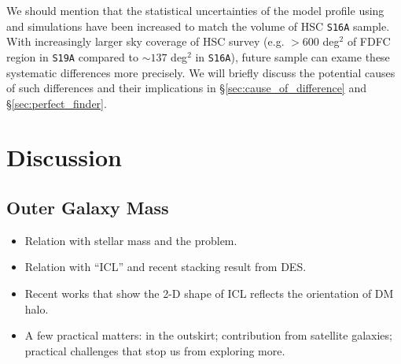 \documentclass[fleqn,usenatbib,useAMS,english]{mnras}
\begin{document}
    We should mention that the statistical uncertainties of the model \dsigma{} profile
    using  and \smdpl{} simulations have been increased to match the volume of
    HSC \texttt{S16A} sample.
    With increasingly larger sky coverage of HSC survey (e.g. $>600$ deg$^2$ of FDFC region
    in \texttt{S19A} compared to $\sim 137$ deg$^2$ in \texttt{S16A}), future sample can
    exame these systematic differences more precisely.
    We will briefly discuss the potential causes of such differences and their implications
    in \S \ref{sec:cause_of_difference} and \S \ref{sec:perfect_finder}.

\section{Discussion}
    \label{sec:discussion}

\subsection{Outer Galaxy Mass}
    \label{sec:outer_mstar}




    \begin{itemize}

        \item Relation with \exsitu{} stellar mass and the problem.

        \item Relation with ``ICL'' \mstar{} and recent stacking result from DES.

        \item Recent works that show the 2-D shape of ICL reflects the orientation of DM halo.

        \item A few practical matters: \mlratio{} in the outskirt; contribution from satellite
            galaxies; practical challenges that stop us from exploring more.

    \end{itemize}
\end{document}
